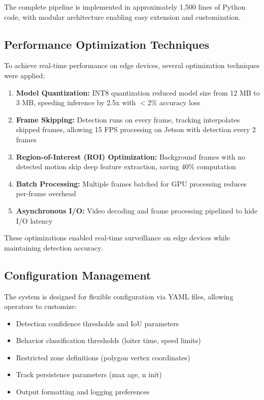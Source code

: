 \documentclass[conference]{IEEEtran}
\begin{document}
The complete pipeline is implemented in approximately 1,500 lines of Python code, with modular architecture enabling easy extension and customization.

\subsection{Performance Optimization Techniques}

To achieve real-time performance on edge devices, several optimization techniques were applied:

\begin{enumerate}
\item \textbf{Model Quantization:} INT8 quantization reduced model size from 12 MB to 3 MB, speeding inference by 2.5x with $< 2\%$ accuracy loss

\item \textbf{Frame Skipping:} Detection runs on every frame, tracking interpolates skipped frames, allowing 15 FPS processing on Jetson with detection every 2 frames

\item \textbf{Region-of-Interest (ROI) Optimization:} Background frames with no detected motion skip deep feature extraction, saving 40\% computation

\item \textbf{Batch Processing:} Multiple frames batched for GPU processing reduces per-frame overhead

\item \textbf{Asynchronous I/O:} Video decoding and frame processing pipelined to hide I/O latency
\end{enumerate}

These optimizations enabled real-time surveillance on edge devices while maintaining detection accuracy.

\subsection{Configuration Management}

The system is designed for flexible configuration via YAML files, allowing operators to customize:
\begin{itemize}
\item Detection confidence thresholds and IoU parameters
\item Behavior classification thresholds (loiter time, speed limits)
\item Restricted zone definitions (polygon vertex coordinates)
\item Track persistence parameters (max age, n init)
\item Output formatting and logging preferences
\end{itemize}
\end{document}
